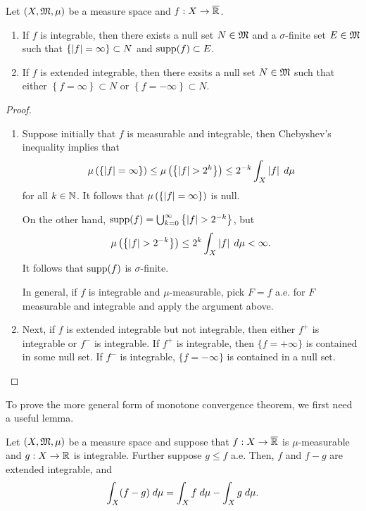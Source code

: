 \documentclass[a4paper]{article}
\begin{document}
\begin{cor}
Let $(X, \mathfrak{M}, \mu)$ be a measure space and $f: X \to \overline{\mathbb{R}}$.
\begin{enumerate}
  \item If $f$ is integrable, then there exists 
  a null set $N \in \mathfrak{M}$ and a $\sigma$-finite set $E \in \mathfrak{M}$
  such that 
  $\left\{ \left\lvert f\right\rvert = \infty \right\} \subset N$ 
  and $\operatorname{supp}(f) \subset E$.

  \item If $f$ is extended integrable, then there 
  exsits a null set $N \in \mathfrak{M}$ such that 
  either $\left\{ f = \infty \right\} \subset N$
  or $\left\{ f = -\infty \right\} \subset N$.
\end{enumerate}
\end{cor}

\begin{proof}
\begin{enumerate}
  \item Suppose initially that $f$ is measurable and integrable, 
  then Chebyshev's inequality implies that 
  \[
  \mu \left( \left\{ \left\lvert f\right\rvert = \infty \right\} \right) 
  \leq \mu \left( \left\{ \left\lvert f\right\rvert > 2^k \right\} \right) 
  \leq 2^{-k} \int_X \left\lvert f\right\rvert \; d \mu
  \]
  for all $k \in \mathbb{N}$. It follows that 
  $\mu \left( \left\{ \left\lvert f\right\rvert = \infty \right\} \right)$ 
  is null. 
  
  On the other hand, $\operatorname{supp}(f) = \bigcup_{k=0}^\infty \left\{ \left\lvert f\right\rvert 
  > 2^{-k} \right\}$, but 
  \[
  \mu \left( \left\{ \left\lvert f\right\rvert > 2^{-k} \right\} \right) 
  \leq 2^k \int_X \left\lvert f\right\rvert \; d \mu < \infty.
  \]
  It follows that $\operatorname{supp}(f)$ is $\sigma$-finite. 
  
  In general, if $f$ is integrable and $\mu$-measurable, 
  pick $F = f$ a.e. for $F$ measurable and integrable and 
  apply the argument above.

  \item Next, if $f$ is extended integrable but not integrable, 
  then either $f^+$ is integrable or $f^-$ is integrable.
  If $f^+$ is integrable, then $\{f = +\infty\}$ is 
  contained in some null set. If $f^-$ is integrable, 
  $\{f = -\infty\}$ is contained in a null set.
\end{enumerate}
\end{proof}

To prove the more general form of monotone convergence theorem,
we first need a useful lemma. 

\begin{lemma}
Let $(X, \mathfrak{M}, \mu)$ be a measure space and suppose that 
$f : X \to \overline{\mathbb{R}}$ is $\mu$-measurable and $g : X \to \mathbb{R}$
is integrable. Further suppose $g \leq f$ a.e. Then, $f$ 
and $f - g$ are extended integrable, and 
\[
\int_X (f - g) \; d \mu = \int_X f \; d \mu - \int_X g \; d \mu.
\]
\end{lemma}
\end{document}

